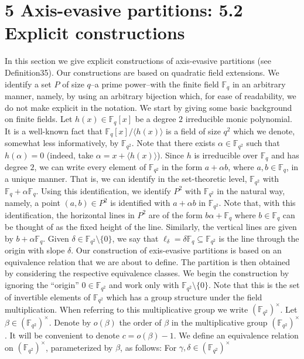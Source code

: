 \section*{5 Axis-evasive partitions: 5.2 Explicit constructions}
In this section we give explicit constructions of axis-evasive partitions (see Definition35). Our constructions are based on quadratic field extensions. We identify a set $P$ of size $q$--a prime power--with the finite field $\mathbb F_q$ in an arbitrary manner, namely, by using an arbitrary bijection which, for ease of readability, we do not make explicit in the notation. We start by giving some basic background on finite fields.
Let $h(x)\in\mathbb F_q[x]$ be a degree $2$ irreducible monic polynomial. It is a well-known fact that $\mathbb F_q[x]/\langle h(x)\rangle$ is a field of size $q^2$ which we denote, somewhat less informatively, by $\mathbb F_{q^2}$. Note that there exists $\alpha\in\mathbb F_{q^2}$ such that $h(\alpha)=0$ (indeed, take $\alpha=x+\langle h(x)\rangle$). Since $h$ is irreducible over $\mathbb F_q$ and has degree $2$, we can write every element of $\mathbb F_{q^2}$ in the form $a+\alpha b$, where $a,b\in\mathbb F_q$, in a unique manner. That is, we can identify in the set-theoretic level, $\mathbb F_{q^2}$ with $\mathbb F_q+\alpha\mathbb F_q$. Using this identification, we identify $P^2$ with $\mathbb F_{q^2}$ in the natural way, namely, a point $(a,b)\in P^2$ is identified with $a+\alpha b$ in $\mathbb F_{q^2}$. Note that, with this identification, the horizontal lines in $P^2$ are of the form $b\alpha+\mathbb F_q$ where $b\in\mathbb F_q$ can be thought of as the fixed height of the line. Similarly, the vertical lines are given by $b+\alpha\mathbb F_q$. Given $\delta\in\mathbb F_{q^2}\setminus\{0\}$, we say that $\ell_\delta=\delta\mathbb F_q\subseteq\mathbb F_{q^2}$ is the line through the origin with slope $\delta$.
Our construction of exis-evasive partitions is based on an equivalence relation that we are about to define. The partition is then obtained by considering the respective equivalence classes. We begin the construction by ignoring the ``origin'' $0\in\mathbb F_{q^2}$ and work only with $\mathbb F_{q^2}\setminus\{0\}$. Note that this is the set of invertible elements of $\mathbb F_{q^2}$ which has a group structure under the field multiplication. When referring to this multiplicative group we write $(\mathbb F_{q^2})^\times$.
Let $\beta\in(\mathbb F_{q^2})^\times$. Denote by $o(\beta)$ the order of $\beta$ in the multiplicative group $(\mathbb F_{q^2})^\times$. It will be convenient to denote $c=o(\beta)-1$. We define an equivalence relation on $(\mathbb F_{q^2})^\times$, parameterized by $\beta$, as follows: For $\gamma,\delta\in(\mathbb F_{q^2})^\times$
